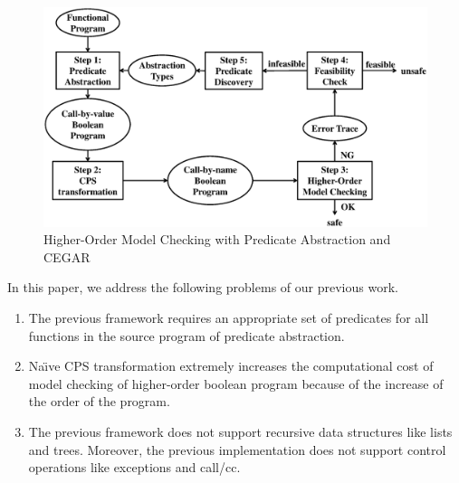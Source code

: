 \begin{figure}[tbp]
 \begin{center}
  \includegraphics[scale=0.4]{overall.eps}
 \end{center}
\caption{Higher-Order Model Checking with Predicate Abstraction and CEGAR }
\label{fig:cegar}
\end{figure}


In this paper, we address the following
problems of our previous work.
\begin{enumerate}
 \item The previous framework requires an appropriate set of predicates for all
       functions in the source program of predicate abstraction.
 \item Na\"{\i}ve CPS transformation extremely increases the computational cost
       of model checking of higher-order boolean program because of the
       increase of the order of the program.
 \item The previous framework does not support recursive data
       structures like lists and trees.  Moreover, the previous
       implementation does not support control operations like
       exceptions and call/cc.
\end{enumerate}

